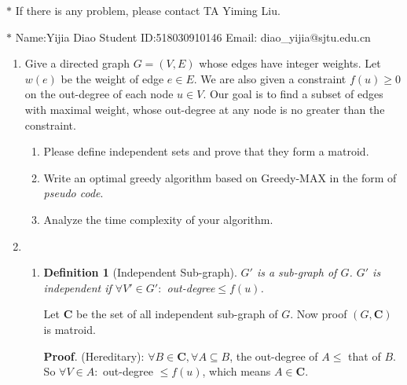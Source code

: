\documentclass[12pt,a4paper,UTF8]{article}
\makeatletter
\newtheorem*{solution}{Solution}
\newtheorem{definition}{Definition}
\theoremstyle{definition}
\renewenvironment{solution}[1][Solution] {\par\pushQED{\qed}\normalfont\topsep6\p@\@plus6\p@\relax\trivlist\item[\hskip\labelsep\bfseries#1\@addpunct{.}]\ignorespaces}{\popQED\endtrivlist\@endpefalse} \makeatother
\makeatother
\begin{document}
\noindent

\noindent{}
\begin{center}
\footnotesize{\color{red}$*$ If there is any problem, please contact TA Yiming Liu.}

\footnotesize{\color{blue}$*$ Name:Yijia Diao \quad Student ID:518030910146 \quad Email: diao\_yijia@sjtu.edu.cn}
\end{center}

\begin{enumerate}
\item Give a directed graph $G=(V,E)$ whose edges have integer weights. Let $w(e)$ be the weight of edge $e\in E$. We are also given a constraint $f(u)\geq 0$ on the out-degree of each node $u\in V$. Our goal is to find a subset of edges with maximal weight, whose out-degree at any node is no greater than the constraint.
	\begin{enumerate}
	    \item Please define independent sets and prove that they form a matroid.
	    \item Write an optimal greedy algorithm based on Greedy-MAX in the form of \emph{pseudo code}.
	    \item Analyze the time complexity of your algorithm.
	\end{enumerate}

	\begin{solution}
		\begin{enumerate}
			\item
			\begin{definition}[Independent Sub-graph]
				$ G' $ is a sub-graph of $ G $. $ G' $ is independent if $ \forall V'\in G':$ out-degree$\leq f(u) $.
			\end{definition}
			Let $ \mathbf{C} $ be the set of all independent sub-graph of $ G $. Now proof $ (G,\mathbf{C}) $ is matroid.
			
			\textbf{Proof}. (Hereditary): $ \forall B\in\mathbf{C},\forall A\subseteq B $, the out-degree of $A \leq $ that of $ B $. So $ \forall V\in A:$ out-degree $\leq f(u) $, which means $ A\in\mathbf{C} $.
			

\end{enumerate}
\end{solution}
\end{enumerate}
\end{document}
